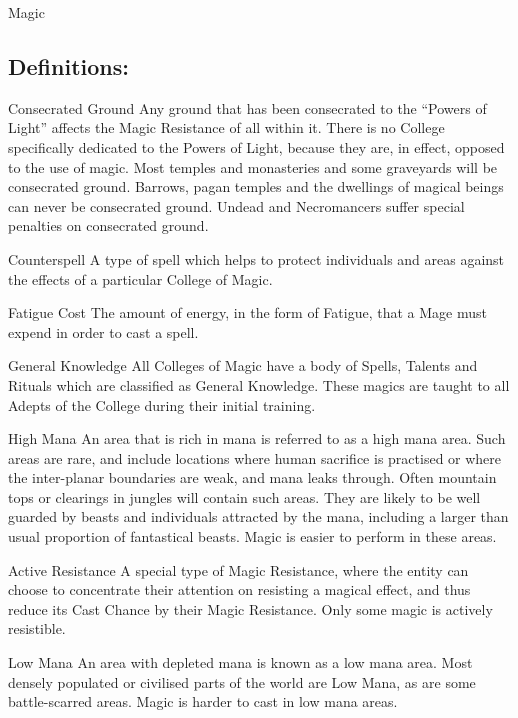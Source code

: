 \begin{Chapter}{Magic}
\subsection{Definitions:}

\begin{Description}

\item[Consecrated Ground] Any ground that has been consecrated to the
  “Powers of Light” affects the Magic Resistance of all within
  it. There is no College specifically dedicated to the Powers of
  Light, because they are, in effect, opposed to the use of magic.
  Most temples and monasteries and some graveyards will be consecrated
  ground.  Barrows, pagan temples and the dwellings of magical beings
  can never be consecrated ground.  Undead and Necromancers suffer
  special penalties on consecrated ground.

\item[Counterspell] A type of spell which helps to protect individuals
  and areas against the effects of a particular College of Magic.

\item[Fatigue Cost] The amount of energy, in the form of Fatigue, that
  a Mage must expend in order to cast a spell.

\item[General Knowledge] All Colleges of Magic have a body of Spells,
  Talents and Rituals which are classified as General Knowledge.
  These magics are taught to all Adepts of the College during their
  initial training.

\item[High Mana] An area that is rich in mana is referred to as a high
  mana area.  Such areas are rare, and include locations where human
  sacrifice is practised or where the inter-planar boundaries are
  weak, and mana leaks through.  Often mountain tops or clearings in
  jungles will contain such areas.  They are likely to be well guarded
  by beasts and individuals attracted by the mana, including a larger
  than usual proportion of fantastical beasts.  Magic is easier to
  perform in these areas.

\item[Active Resistance] A special type of Magic Resistance, where the
  entity can choose to concentrate their attention on resisting a
  magical effect, and thus reduce its Cast Chance by their Magic
  Resistance. Only some magic is actively resistible.

\item[Low Mana] An area with depleted mana is known as a low mana
  area.  Most densely populated or civilised parts of the world are
  Low Mana, as are some battle-scarred areas.  Magic is harder to cast
  in low mana areas.


\end{Description}
\end{Chapter}
